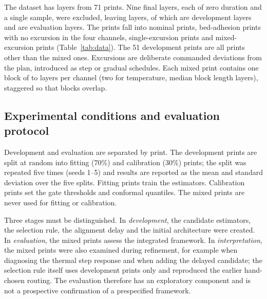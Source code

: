 \documentclass[10pt,a4paper,twocolumn]{article}
\begin{document}
The dataset has \layersTotal{} layers from 71 prints. Nine final layers, each of zero duration and a single sample, were excluded, leaving \layersUsed{} layers, of which \layersDev{} are development layers and \layersTest{} are evaluation layers. The prints fall into \nNormal{} nominal prints, \nBed{} bed-adhesion prints with no excursion in the four channels, \nSingle{} single-excursion prints and \nMixed{} mixed-excursion prints (Table~\ref{tab:data}). The 51 development prints are all prints other than the mixed ones. Excursions are deliberate commanded deviations from the plan, introduced as step or gradual schedules. Each mixed print contains one block of \evLenMin{} to \evLenMax{} layers per channel (two for temperature, median block length \evLenMed{} layers), staggered so that blocks overlap.

\begin{table}[t]\centering\small
\caption{Print groups and commanded deviations from plan. Ranges are over excursion layers.}\label{tab:data}
\end{table}

\subsection{Experimental conditions and evaluation protocol}\label{sec:protocol}
Development and evaluation are separated by print. The development prints are split at random into fitting (70\%) and calibration (30\%) prints; the split was repeated five times (seeds 1--5) and results are reported as the mean and standard deviation over the five splits. Fitting prints train the estimators. Calibration prints set the gate thresholds and conformal quantiles. The \printsTest{} mixed prints are never used for fitting or calibration.

Three stages must be distinguished. In \emph{development}, the candidate estimators, the selection rule, the alignment delay and the initial architecture were created. In \emph{evaluation}, the \printsTest{} mixed prints assess the integrated framework. In \emph{interpretation}, the mixed prints were also examined during refinement, for example when diagnosing the thermal step response and when adding the delayed candidate; the selection rule itself uses development prints only and reproduced the earlier hand-chosen routing. The evaluation therefore has an exploratory component and is not a prospective confirmation of a prespecified framework.
\end{document}
